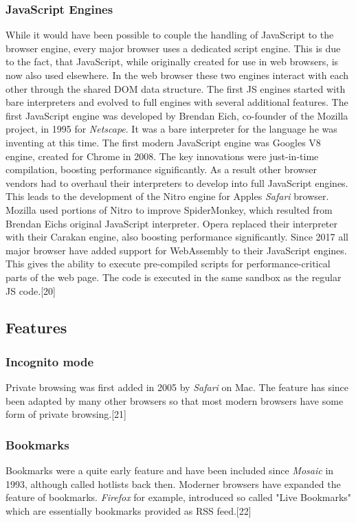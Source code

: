 \documentclass[runningheads]{llncs}
\begin{document}
			\subsubsection{JavaScript Engines} \leavevmode\newline
			While it would have been possible to couple the handling of JavaScript to the browser engine, every major browser uses a dedicated script engine. This is due to the fact, that JavaScript, while originally created for use in web browsers, is now also used elsewhere. In the web browser these two engines interact with each other through the shared DOM data structure.
			The first JS engines started with bare interpreters and evolved to full engines with several additional features. The first JavaScript engine was developed by Brendan Eich, co-founder of the Mozilla project, in 1995 for \textit{Netscape}. It was a bare interpreter for the language he was inventing at this time. The first modern JavaScript engine was Googles V8 engine, created for Chrome in 2008. The key innovations were just-in-time compilation, boosting performance significantly. As a result other browser vendors had to overhaul their interpreters to develop into full JavaScript engines. This leads to the development of the Nitro engine for Apples \textit{Safari} browser. Mozilla used portions of Nitro to improve SpiderMonkey, which resulted from Brendan Eichs original JavaScript interpreter. Opera replaced their interpreter with their Carakan engine, also boosting performance significantly.
			Since 2017 all major browser have added support for WebAssembly to their JavaScript engines. This gives the ability to execute pre-compiled scripts for performance-critical parts of the web page. The code is executed in the same sandbox as the regular JS code.[20]
			
		\subsection{Features}
			\subsubsection{Incognito mode}
			\leavevmode\newline
			Private browsing was first added in 2005 by \textit{Safari} on Mac. The feature has since been adapted by many other browsers so that most modern browsers have some form of private browsing.[21]
			\subsubsection{Bookmarks}
			\leavevmode\newline
			Bookmarks were a quite early feature and have been included since \textit{Mosaic} in 1993, although called hotlists back then. Moderner browsers have expanded the feature of bookmarks. \textit{Firefox} for example, introduced so called "Live Bookmarks" which are essentially bookmarks provided as RSS feed.[22]
\end{document}
